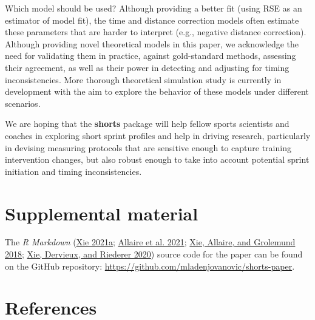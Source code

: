 \documentclass[fleqn,10pt]{wlpeerj} %
\begin{document}
\normalsize

Which model should be used? Although providing a better fit (using RSE as an estimator of model fit), the time and distance correction models often estimate these parameters that are harder to interpret (e.g., negative distance correction). Although providing novel theoretical models in this paper, we acknowledge the need for validating them in practice, against gold-standard methods, assessing their agreement, as well as their power in detecting and adjusting for timing inconsistencies. More thorough theoretical simulation study is currently in development with the aim to explore the behavior of these models under different scenarios.

We are hoping that the \textbf{shorts} package will help fellow sports scientists and coaches in exploring short sprint profiles and help in driving research, particularly in devising measuring protocols that are sensitive enough to capture training intervention changes, but also robust enough to take into account potential sprint initiation and timing inconsistencies.

\hypertarget{supplemental-material}{%
\section{Supplemental material}\label{supplemental-material}}

The \emph{R Markdown} (\protect\hyperlink{ref-R-bookdown}{Xie 2021a}; \protect\hyperlink{ref-R-rmarkdown}{Allaire et al. 2021}; \protect\hyperlink{ref-rmarkdown2018}{Xie, Allaire, and Grolemund 2018}; \protect\hyperlink{ref-rmarkdown2020}{Xie, Dervieux, and Riederer 2020}) source code for the paper can be found on the GitHub repository: \url{https://github.com/mladenjovanovic/shorts-paper}.

\hypertarget{references}{%
\section*{References}\label{references}}
\end{document}
